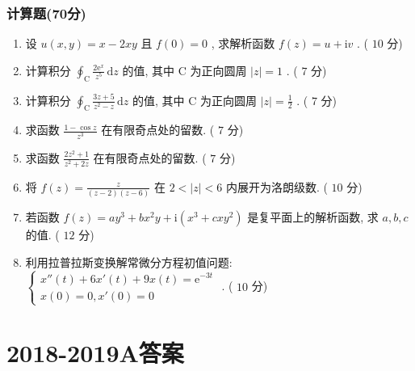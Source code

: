 \documentclass[cn,11pt,fancy,hide]{elegantbook}
\newcommand{\ee}{\mathrm{e}}
\newcommand{\dd}{\,\mathrm{d}}
\newcommand{\ii}{\mathrm{i}}
\begin{document}
\subsubsection{计算题(70分)}
\begin{enumerate}
	\item 设 $u(x,y)=x-2xy$ 且 $f(0)=0$ , 求解析函数 $f(z)=u+\ii v$ . ( $10$ 分)
	
	\item 计算积分 $\oint_{\mathrm{C}}\frac{2\ee^x}{z^5}\dd z$ 的值, 其中 $\mathrm{C}$ 为正向圆周 $|z|=1$ . ( $7$ 分)
	
	\item 计算积分 $\oint_{\mathrm{C}}\frac{3z+5}{z^2-z}\dd z$ 的值, 其中 $\mathrm{C}$ 为正向圆周 $|z|=\frac{1}{2}$ . ( $7$ 分)
	
	\item 求函数 $\frac{1-\cos z}{z^3}$ 在有限奇点处的留数. ( $7$ 分)
	
	\item 求函数 $\frac{2z^2+1}{z^2+2z}$ 在有限奇点处的留数. ( $7$ 分)
	
	\item 将 $f(z)=\frac{z}{(z-2)(z-6)}$ 在 $2<|z|<6$ 内展开为洛朗级数. ( $10$ 分)
	
	\item 若函数 $f(z)=a y^{3}+b x^{2} y+\ii\left(x^{3}+c x y^{2}\right)$ 是复平面上的解析函数, 求 $a,b,c$ 的值. ( $12$ 分)
	
	\item 利用拉普拉斯变换解常微分方程初值问题: $\begin{cases}
	x''(t)+6x'(t)+9x(t)=\ee^{-3t}\\
	x(0)=0, x'(0)=0
	\end{cases}$ . ( $10$ 分)
\end{enumerate}



\section{2018-2019A答案}
\end{document}
